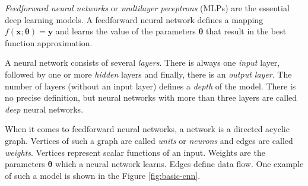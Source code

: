 \textit{Feedforward neural networks} or \textit{multilayer peceptrons} (MLPs) are the essential deep learning models. A feedforward neural network defines a mapping $f (\pmb{x} ; \pmb{\theta}) = \pmb{y}$ and learns the value of the parameters $\pmb{\theta}$ that result in the best function approximation.

A neural network consists of several \textit{layers}. There is always one \textit{input} layer, followed by one or more \textit{hidden} layers and finally, there is an \textit{output layer}. The number of layers (without an input layer) defines a \textit{depth} of the model. There is no precise definition, but neural networks with more than three layers are called \textit{deep} neural networks. 

When it comes to feedforward neural networks, a network is a directed acyclic graph. Vertices of such a graph are called \textit{units} or \textit{neurons} and edges are called \textit{weights}. Vertices represent scalar functions of an input. Weights are the parameters $\pmb \theta$ which a neural network learns. Edges define data flow. One example of such a model is shown in the Figure \ref{fig:basic-cnn}.


